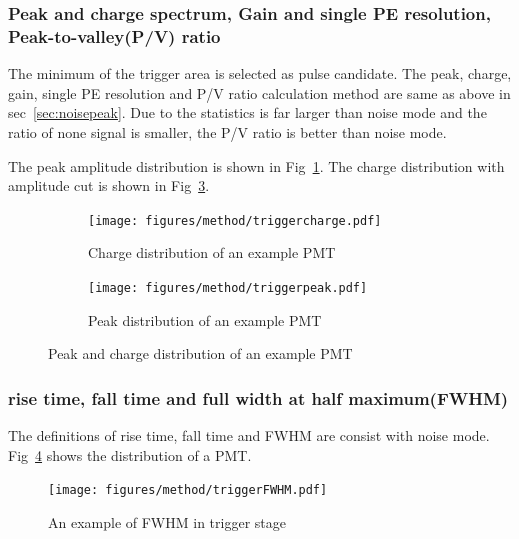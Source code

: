 \subsubsection{Peak and charge spectrum, Gain and single PE resolution, Peak-to-valley(P/V) ratio}
\label{sec:triggerpeak}
The minimum of the trigger area is selected as pulse candidate. The peak, charge, gain, single PE resolution and P/V ratio calculation method are same as above in sec~\ref{sec:noisepeak}. Due to the statistics is far larger than noise mode and the ratio of none signal is smaller, the P/V ratio is better than noise mode.

The peak amplitude distribution is shown in Fig~\ref{fig:triggerpeak}. The charge distribution with amplitude cut is shown in Fig~\ref{fig:triggercharge}.
\begin{figure}[!htbp]
    \centering
    \begin{subfigure}[b]{0.45\textwidth}
        \texttt{[image: figures/method/triggercharge.pdf]}
        \caption{Charge distribution of an example PMT}%
        \label{fig:triggerpeak}
    \end{subfigure}
    \begin{subfigure}[b]{0.45\textwidth}
        \texttt{[image: figures/method/triggerpeak.pdf]}
        \caption{Peak distribution of an example PMT}%
        \label{fig:triggercharge}
    \end{subfigure}
    \caption{Peak and charge distribution of an example PMT}
\end{figure}

\subsubsection{rise time, fall time and full width at half maximum(FWHM)}
The definitions of rise time, fall time and FWHM are consist with noise mode. Fig~\ref{fig:triggerFWHM} shows the distribution of a PMT.
\begin{figure}[!htbp]
    \texttt{[image: figures/method/triggerFWHM.pdf]}
    \caption{An example of FWHM in trigger stage}
    \label{fig:triggerFWHM}
\end{figure}
